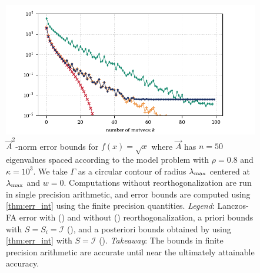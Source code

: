 \begin{figure}[htb]
    \begin{center}
        \includegraphics{imgs/ch8_CIF.pdf} 
    \end{center}
    \caption[{\( \vec{A}^2 \)-norm error bounds for \( f(x) = \sqrt{x} \) where \( \vec{A} \) has \( n=50 \) eigenvalues spaced according to the model problem with \( \rho = 0.8 \) and \( \kappa = 10^{3} \)}]{%
        \( \vec{A}^2 \)-norm error bounds for \( f(x) = \sqrt{x} \) where \( \vec{A} \) has \( n=50 \) eigenvalues spaced according to the model problem with \( \rho = 0.8 \) and \( \kappa = 10^{3} \). We take \( \Gamma \) as a circular contour of radius \( \lambda_{\textup{max}} \) centered at \( \lambda_{\textup{max}} \) and \( w=0 \). Computations without reorthogonalization are run in single precision arithmetic, and error bounds are computed using \cref{thm:err_int} using the finite precision quantities.
    \hspace{.25em}\emph{Legend}:
    Lanczos-FA error with  
    ({\protect{}}) and without 
    ({\protect{}}) reorthogonalization, 
    a priori bounds with \( S = S_i = \mathcal{I} \)
    ({\protect{}}), and
    a posteriori bounds obtained by using \cref{thm:err_int} with \( S = \mathcal{I} \)
    ({\protect{}}).
    \hspace{.25em}\emph{Takeaway}: The bounds in finite precision arithmetic are accurate until near the ultimately attainable accuracy. 
    }
    \label{fig:ch8_CIF}
\end{figure}

